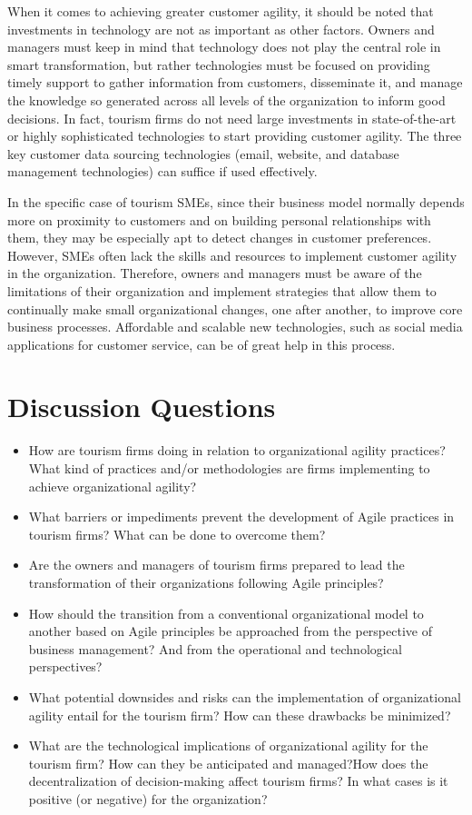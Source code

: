 \documentclass[
  letterpaper,
  DIV=11,
  numbers=noendperiod]{scrreprt}
\begin{document}
When it comes to achieving greater customer agility, it should be noted
that investments in technology are not as important as other factors.
Owners and managers must keep in mind that technology does not play the
central role in smart transformation, but rather technologies must be
focused on providing timely support to gather information from
customers, disseminate it, and manage the knowledge so generated across
all levels of the organization to inform good decisions. In fact,
tourism firms do not need large investments in state-of-the-art or
highly sophisticated technologies to start providing customer agility.
The three key customer data sourcing technologies (email, website, and
database management technologies) can suffice if used effectively.

In the specific case of tourism SMEs, since their business model
normally depends more on proximity to customers and on building personal
relationships with them, they may be especially apt to detect changes in
customer preferences. However, SMEs often lack the skills and resources
to implement customer agility in the organization. Therefore, owners and
managers must be aware of the limitations of their organization and
implement strategies that allow them to continually make small
organizational changes, one after another, to improve core business
processes. Affordable and scalable new technologies, such as social
media applications for customer service, can be of great help in this
process.

\hypertarget{discussion-questions-13}{%
\section{Discussion Questions}\label{discussion-questions-13}}

\begin{itemize}
\item
  How are tourism firms doing in relation to organizational agility
  practices? What kind of practices and/or methodologies are firms
  implementing to achieve organizational agility?
\item
  What barriers or impediments prevent the development of Agile
  practices in tourism firms? What can be done to overcome them?
\item
  Are the owners and managers of tourism firms prepared to lead the
  transformation of their organizations following Agile principles?
\item
  How should the transition from a conventional organizational model to
  another based on Agile principles be approached from the perspective
  of business management? And from the operational and technological
  perspectives?
\item
  What potential downsides and risks can the implementation of
  organizational agility entail for the tourism firm? How can these
  drawbacks be minimized?
\item
  What are the technological implications of organizational agility for
  the tourism firm? How can they be anticipated and managed?How does the
  decentralization of decision-making affect tourism firms? In what
  cases is it positive (or negative) for the organization?
\end{itemize}
\end{document}
